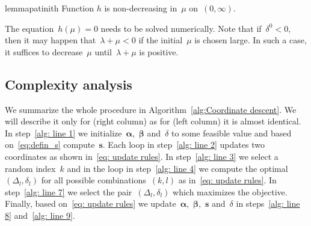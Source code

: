 \begin{restatable}{lemma}{patinith}\label{lemma:problem2}
  Function $h$ is non-decreasing in~$\mu$ on~$(0,\infty)$.
\end{restatable}
  
\noindent The equation~$h(\mu) = 0$ needs to be solved numerically. Note that if~$\delta^0 < 0$, then it may happen that~$\lambda + \mu < 0$ if the initial~$\mu$ is chosen large. In such a case, it suffices to decrease~$\mu$ until~$\lambda + \mu$ is positive.

\subsection{Complexity analysis}

We summarize the whole procedure in Algorithm~\ref{alg:Coordinate descent}. We will describe it only for \PatMat (right column) as for \TopPushK (left column) it is almost identical. In step~\ref{alg: line 1} we initialize~$\bm{\alpha}$,~$\bm{\beta}$ and~$\delta$ to some feasible value and based on~\eqref{eq:defin_s} compute~$\bm s$. Each \repeatloop loop in step~\ref{alg: line 2} updates two coordinates as shown in~\eqref{eq: update rules}. In step~\ref{alg: line 3} we select a random index~$k$ and in the \forloop loop in step~\ref{alg: line 4} we compute the optimal~$(\Delta_l,\delta_l)$ for all possible combinations~$(k,l)$ as in~\eqref{eq: update rules}. In step~\ref{alg: line 7} we select the pair~$(\Delta_l,\delta_l)$ which maximizes the objective. Finally, based on~\eqref{eq: update rules} we update~$\bm{\alpha}$,~$\bm{\beta}$,~$\bm s$ and~$\delta$ in steps~\ref{alg: line 8} and~\ref{alg: line 9}.

